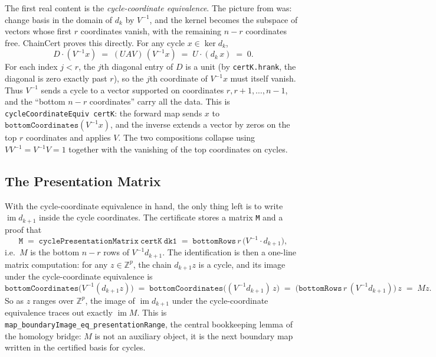 \documentclass[11pt]{article}
\theoremstyle{plain}
\theoremstyle{definition}
\theoremstyle{remark}
\newcommand{\lean}[1]{\lstinline[language=lean]|#1|}
\begin{document}
The first real content is the \emph{cycle-coordinate equivalence}. The picture
from  was: change basis in the domain of \(d_k\) by
\(V^{-1}\), and the kernel becomes the subspace of vectors whose first \(r\)
coordinates vanish, with the remaining \(n - r\) coordinates free. ChainCert
proves this directly. For any cycle \(x \in \ker d_k\),
\[
    D \cdot (V^{-1} x)
      \;=\; (UAV)\,(V^{-1} x)
      \;=\; U \cdot (d_k \, x)
      \;=\; 0.
\]
For each index \(j < r\), the \(j\)th diagonal entry of \(D\) is a unit (by
\lean{certK.hrank}, the diagonal is zero exactly past \(r\)), so the \(j\)th
coordinate of \(V^{-1} x\) must itself vanish. Thus \(V^{-1}\) sends a cycle to
a vector supported on coordinates \(r, r+1, \ldots, n - 1\), and the
``bottom \(n - r\) coordinates'' carry all the data. This is
\lean{cycleCoordinateEquiv certK}: the forward map sends \(x\) to
\(\mathtt{bottomCoordinates}(V^{-1} x)\), and the inverse extends a vector by
zeros on the top \(r\) coordinates and applies \(V\). The two compositions
collapse using \(V V^{-1} = V^{-1} V = 1\) together with the vanishing of
the top coordinates on cycles.

\subsection{The Presentation Matrix}

With the cycle-coordinate equivalence in hand, the only thing left is to write
\(\operatorname{im} d_{k+1}\) inside the cycle coordinates. The certificate
stores a matrix \lean{M} and a proof that
\[
    \mathtt{M} \;=\; \mathtt{cyclePresentationMatrix\ certK\ dk1}
        \;=\; \mathtt{bottomRows}\, r\, \bigl(V^{-1} \cdot d_{k+1}\bigr),
\]
i.e.\ \(M\) is the bottom \(n - r\) rows of \(V^{-1} d_{k+1}\). The
identification is then a one-line matrix computation: for any
\(z \in \mathbb{Z}^p\), the chain \(d_{k+1} z\) is a cycle, and its image
under the cycle-coordinate equivalence is
\[
    \mathtt{bottomCoordinates}\bigl(V^{-1} (d_{k+1} z)\bigr)
      \;=\; \mathtt{bottomCoordinates}\bigl((V^{-1} d_{k+1})\, z\bigr)
      \;=\; \bigl(\mathtt{bottomRows}\, r\,(V^{-1} d_{k+1})\bigr)\, z
      \;=\; M z.
\]
So as \(z\) ranges over \(\mathbb{Z}^p\), the image of
\(\operatorname{im} d_{k+1}\) under the cycle-coordinate equivalence traces
out exactly \(\operatorname{im} M\). This is
\lean{map_boundaryImage_eq_presentationRange}, the central bookkeeping lemma
of the homology bridge: \(M\) is not an auxiliary object, it is the next
boundary map written in the certified basis for cycles.
\end{document}
